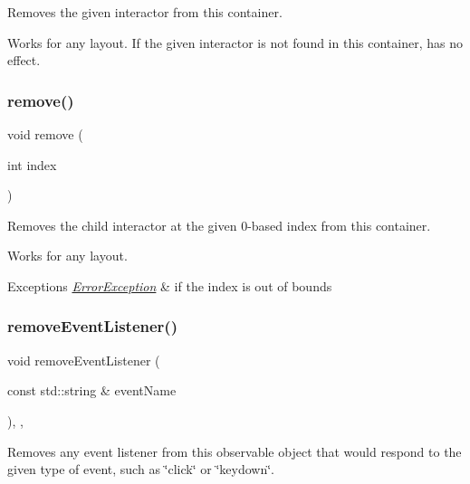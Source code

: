 Removes the given interactor from this container. 

Works for any layout. If the given interactor is not found in this container, has no effect. \mbox{\label{classGContainer_a2ad1aa316f278b2e9fa8121504749652}} 
\subsubsection{\texorpdfstring{remove()}{remove()}\hspace{0.1cm}{\footnotesize\ttfamily [3/3]}}
{\footnotesize\ttfamily void remove (\begin{DoxyParamCaption}\item[{int}]{index }\end{DoxyParamCaption})\hspace{0.3cm}{\ttfamily [virtual]}}



Removes the child interactor at the given 0-\/based index from this container. 

Works for any layout. 
\begin{DoxyExceptions}{Exceptions}
{\em \mbox{\hyperlink{classErrorException}{Error\+Exception}}} & if the index is out of bounds \\
\hline
\end{DoxyExceptions}
\mbox{\label{classGObservable_acbcf1ed3a851ad8a3c17ef38d86b481d}} 
\subsubsection{\texorpdfstring{remove\+Event\+Listener()}{removeEventListener()}}
{\footnotesize\ttfamily void remove\+Event\+Listener (\begin{DoxyParamCaption}\item[{const std\+::string \&}]{event\+Name }\end{DoxyParamCaption})\hspace{0.3cm}{\ttfamily [protected]}, {\ttfamily [virtual]}, {\ttfamily [inherited]}}



Removes any event listener from this observable object that would respond to the given type of event, such as \char`\"{}click\char`\"{} or \char`\"{}keydown\char`\"{}. 

